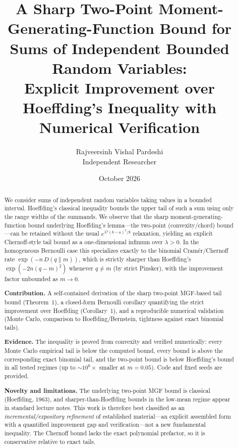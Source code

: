 \documentclass[11pt]{article}
\title{A Sharp Two-Point Moment-Generating-Function Bound for Sums of Independent Bounded Random Variables:\\
Explicit Improvement over Hoeffding's Inequality with Numerical Verification}
\author{Rajveersinh Vishal Pardeshi\\[2pt] Independent Researcher}
\date{October 2026}
\begin{document}
\maketitle

\begin{abstract}
We consider sums of independent random variables taking values in a bounded interval. Hoeffding's classical inequality bounds the upper tail of such a sum using only the range widths of the summands. We observe that the sharp moment-generating-function bound underlying Hoeffding's lemma---the two-point (convexity/chord) bound---can be retained without the usual $e^{\lambda^2(b-a)^2/8}$ relaxation, yielding an explicit Chernoff-style tail bound as a one-dimensional infimum over $\lambda>0$. In the homogeneous Bernoulli case this specializes exactly to the binomial Cram\'er/Chernoff rate $\exp(-n\,D(q\|m))$, which is strictly sharper than Hoeffding's $\exp(-2n(q-m)^2)$ whenever $q\neq m$ (by strict Pinsker), with the improvement factor unbounded as $m\to0$.

\textbf{Contribution.} A self-contained derivation of the sharp two-point MGF-based tail bound (Theorem~1), a closed-form Bernoulli corollary quantifying the strict improvement over Hoeffding (Corollary~1), and a reproducible numerical validation (Monte Carlo, comparison to Hoeffding/Bernstein, tightness against exact binomial tails).

\textbf{Evidence.} The inequality is proved from convexity and verified numerically: every Monte Carlo empirical tail is below the computed bound, every bound is above the corresponding exact binomial tail, and the two-point bound is below Hoeffding's bound in all tested regimes (up to $\sim10^6\times$ smaller at $m=0.05$). Code and fixed seeds are provided.

\textbf{Novelty and limitations.} The underlying two-point MGF bound is classical (Hoeffding, 1963), and sharper-than-Hoeffding bounds in the low-mean regime appear in standard lecture notes. This work is therefore best classified as an \emph{incremental/expository refinement} of established material---an explicit assembled form with a quantified improvement gap and verification---not a new fundamental inequality. The Chernoff bound lacks the exact polynomial prefactor, so it is conservative relative to exact tails.
\end{abstract}

\end{document}
